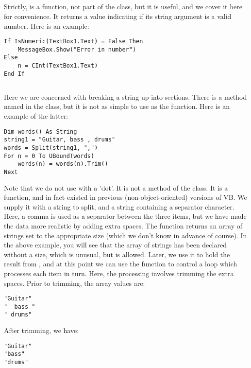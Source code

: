 		\subsection*{}
			Strictly,  is a function, not part of the  class, but it is useful, and we cover it here for convenience. It returns a  value indicating if its string argument is a valid number. Here is an example:
			\begin{lstlisting}
If IsNumeric(TextBox1.Text) = False Then
	MessageBox.Show("Error in number")
Else
	n = CInt(TextBox1.Text)
End If
			\end{lstlisting}

		\subsection*{}
			Here we are concerned with breaking a string up into sections. There is a method named  in the  class, but it is not as simple to use as the  function. Here is an example of the latter:
			\begin{lstlisting}
Dim words() As String
string1 = "Guitar, bass , drums"
words = Split(string1, ",")
For n = 0 To UBound(words)
	words(n) = words(n).Trim()
Next
			\end{lstlisting}
			Note that we do not use  with a 'dot'. It is not a method of the  class. It is a function, and in fact existed in previous (non-object-oriented) versions of VB. We supply it with a string to split, and a string containing a separator character. Here, a comma is used as a separator between the three items, but we have made the data more realistic by adding extra spaces. The  function returns an array of strings set to the appropriate size (which we don't know in advance of course). In the above example, you will see that the array of strings has been declared without a size, which is unusual, but is allowed. Later, we use it to hold the result from , and at this point we can use the  function to control a loop which processes each item in turn. Here, the processing involves trimming the extra spaces. Prior to trimming, the array values are:
			\begin{lstlisting}
"Guitar"
"  bass "
" drums"
			\end{lstlisting}
			After trimming, we have:
			\begin{lstlisting}
"Guitar"
"bass"
"drums"
			\end{lstlisting}

